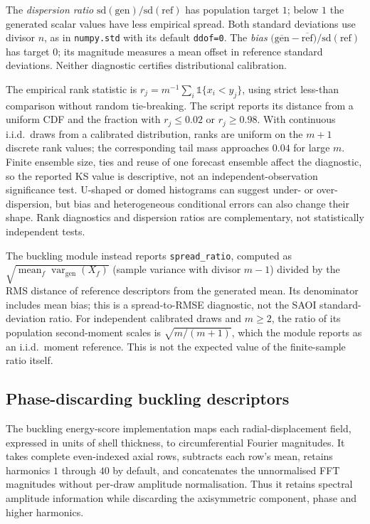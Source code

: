 The \emph{dispersion ratio} $\mathrm{sd}(\text{gen})/\mathrm{sd}(\text{ref})$
has population target $1$; below $1$ the generated scalar values have less
empirical spread. Both standard deviations use divisor $n$, as in
\texttt{numpy.std} with its default \texttt{ddof=0}. The \emph{bias}
$\bigl(\overline{\text{gen}}-\overline{\text{ref}}\bigr)/\mathrm{sd}(\text{ref})$
has target $0$; its magnitude measures a mean offset in reference standard
deviations. Neither diagnostic certifies distributional calibration.

The empirical rank statistic is
$r_j=m^{-1}\sum_i\mathbb{1}\{x_i<y_j\}$, using strict less-than comparison
without random tie-breaking. The script reports its distance from a uniform
CDF and the fraction with $r_j\leq0.02$ or $r_j\geq0.98$. With continuous
i.i.d.\ draws from a calibrated distribution, ranks are uniform on the
$m+1$ discrete rank values; the corresponding tail mass approaches $0.04$
for large $m$. Finite ensemble size, ties and reuse of one forecast ensemble
affect the diagnostic, so the reported KS value is descriptive, not an
independent-observation significance test. U-shaped or domed histograms can
suggest under- or over-dispersion, but bias and heterogeneous conditional
errors can also change their shape. Rank diagnostics and dispersion ratios
are complementary, not statistically independent tests.

The buckling module instead reports \texttt{spread\_ratio}, computed as
$\sqrt{\operatorname{mean}_f\operatorname{var}_{\mathrm{gen}}(X_f)}$
(sample variance with divisor $m-1$) divided by the RMS distance of reference
descriptors from the generated mean. Its denominator includes mean bias;
this is a spread-to-RMSE diagnostic, not the SAOI standard-deviation ratio.
For independent calibrated draws and $m\geq2$, the ratio of its population
second-moment scales is $\sqrt{m/(m+1)}$, which the module reports as an
i.i.d.\ moment reference. This is not the expected value of the finite-sample
ratio itself.

\subsection{Phase-discarding buckling descriptors}
\label{sec:protocol:symmetry}

The buckling energy-score implementation maps each radial-displacement field,
expressed in units of shell thickness, to circumferential Fourier magnitudes.
It takes complete even-indexed axial rows, subtracts each row's mean, retains
harmonics $1$ through $40$ by default, and concatenates the unnormalised FFT
magnitudes without per-draw amplitude normalisation. Thus it retains spectral
amplitude information while discarding the axisymmetric component, phase and
higher harmonics.

